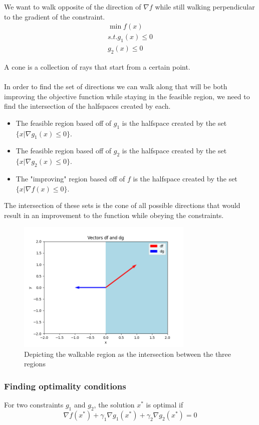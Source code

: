 We want to walk opposite of the direction of $\nabla f$ while still walking perpendicular to the gradient of the constraint.
\begin{equation}
  \begin{aligned}
    \min f(x) \\
    s.t. g_1(x) \leq 0 \\
    g_2(x) \leq 0
  \end{aligned}
\end{equation}

A cone is a collection of rays that start from a certain point.
\\ \\ 
In order to find the set of directions we can walk along that will be both improving the objective function while staying in the feasible region, we need to find the intersection of the halfspaces created by each. 
\begin{itemize}
  \item The feasible region based off of $g_1$ is the halfspace created by the set $\{x | \nabla g_1(x) \leq 0 \}$.
  \item The feasible region based off of $g_2$ is the halfspace created by the set $\{x | \nabla g_2(x) \leq 0 \}$.
  \item The "improving" region based off of $f$ is the halfspace created by the set $\{ x | \nabla f(x) \leq 0 \}$.
\end{itemize}
The intersection of these sets is the cone of all possible directions that would result in an improvement to the function while obeying the constraints.

\begin{figure}[htbp]
  \centerline{\includegraphics[width=0.75\textwidth]{images/walkable_region.png}}
  \caption{Depicting the walkable region as the intersection between the three regions}
  \label{fig:walkable_region}
\end{figure}

\subsubsection{Finding optimality conditions}
For two constraints $g_1$ and $g_2$, the solution $x^*$ is optimal if 
\begin{equation}
  \nabla f(x^*) + \gamma_1 \nabla g_1(x^*) + \gamma_2 \nabla g_2(x^*) = 0
\end{equation}